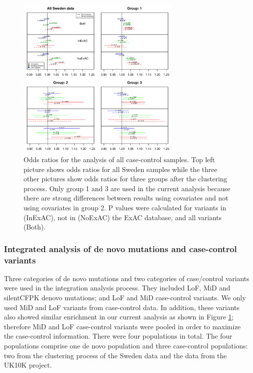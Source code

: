 \documentclass[]{article}
\begin{document}
\begin{figure}[ht]
\includegraphics[width=\textwidth, height=8cm]{Picture/ClusteringSwdenPops.pdf}
\caption{Odds ratios for the analysis of all case-control
  samples. Top left picture shows odds ratios for all Sweden samples
  while the three other pictures show odds ratios for three groups
  after the clustering process. Only group 1 and 3 are used in the
  current analysis because there are strong differences between results
  using covariates and not using covariates in group 2. P values were
  calculated for variants in (InExAC), not in (NoExAC) the ExAC database, and all variants (Both).}
\label{fig:homegeneouspopfrompca}
\end{figure}

\subsubsection{Integrated analysis of de novo mutations and
  case-control variants}

Three categories of de novo mutations and two categories of case/control variants were used in the integration analysis process. They included LoF, MiD and silentCFPK denovo mutations; and LoF and MiD case-control variants. We only used MiD and LoF
variants from case-control data. In addition, these variants also
showed similar enrichment in our current analysis as shown in Figure \ref{fig:homegeneouspopfrompca};
therefore MiD and LoF case-control variants were pooled in order to
maximize the case-control information. There were four populations in total. The four populations comprise one de novo population and three
case-control populations: two from the clustering process of the Sweden data and the data from the UK10K project.
\end{document}

